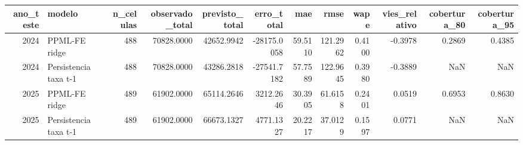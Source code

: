 \begin{tabular}{rlrrrrrrrrrr}
\toprule
ano_teste & modelo & n_celulas & observado_total & previsto_total & erro_total & mae & rmse & wape & vies_relativo & cobertura_80 & cobertura_95 \\
\midrule
2024 & PPML-FE ridge & 488 & 70828.0000 & 42652.9942 & -28175.0058 & 59.5110 & 121.2962 & 0.4100 & -0.3978 & 0.2869 & 0.4385 \\
2024 & Persistencia taxa t-1 & 488 & 70828.0000 & 43286.2818 & -27541.7182 & 57.7589 & 122.9645 & 0.3980 & -0.3889 & NaN & NaN \\
2025 & PPML-FE ridge & 489 & 61902.0000 & 65114.2646 & 3212.2646 & 30.3905 & 61.6158 & 0.2401 & 0.0519 & 0.6953 & 0.8630 \\
2025 & Persistencia taxa t-1 & 489 & 61902.0000 & 66673.1327 & 4771.1327 & 20.2217 & 37.0129 & 0.1597 & 0.0771 & NaN & NaN \\
\bottomrule
\end{tabular}
